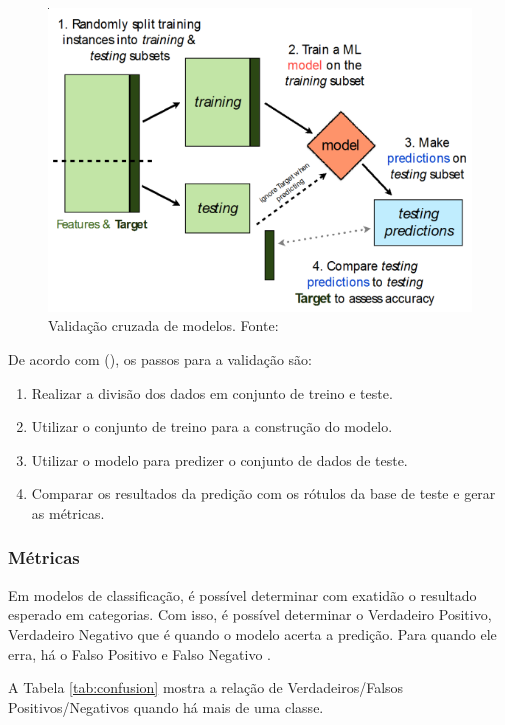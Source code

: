 \begin{figure}[ht]
	\centering
    \includegraphics[keepaspectratio=true,scale=0.7]{figuras/crossValidation}
	\caption[Validação cruzada de modelos]{Validação cruzada de modelos. Fonte: }
	\label{fig:crossValidation}
\end{figure}

De acordo com \citeauthor{brink_real-world_2015} (\citeyear{brink_real-world_2015}), os passos para a validação são: 
\begin{enumerate}
	\item Realizar a divisão dos dados em conjunto de treino e teste.
	\item Utilizar o conjunto de treino para a construção do modelo.
    \item Utilizar o modelo para predizer o conjunto de dados de teste.
    \item Comparar os resultados da predição com os rótulos da base de teste e gerar as métricas.
\end{enumerate}

\subsubsection{Métricas}

Em modelos de classificação, é possível determinar com exatidão o resultado esperado em categorias. Com isso, é possível determinar o Verdadeiro Positivo, Verdadeiro Negativo que é quando o modelo acerta a predição. Para quando ele erra, há o Falso Positivo e Falso Negativo \cite{brink_real-world_2015}.

A Tabela \ref{tab:confusion} mostra a relação de Verdadeiros/Falsos Positivos/Negativos quando há mais de uma classe.

